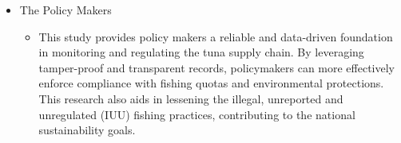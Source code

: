 \begin{itemize}
	\item The Policy Makers 
	\begin{itemize}
		\item This study provides policy makers a reliable and data-driven foundation in monitoring and regulating the tuna supply chain. By leveraging tamper-proof and transparent records, policymakers can more effectively enforce compliance with fishing quotas and environmental protections. This research also aids in lessening the illegal, unreported and unregulated (IUU) fishing practices, contributing to the national sustainability goals. 
	\end{itemize}
\end{itemize}

\begin{comment}
	If applicable, describe possible commercialization and/or innovation in your research.
\end{comment}


